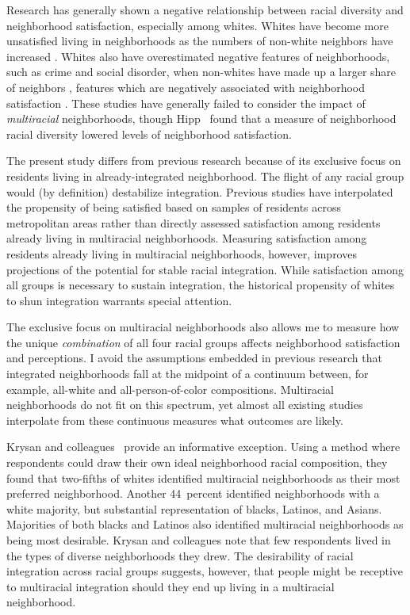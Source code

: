 \documentclass{baderart}
\begin{document}
Research has generally shown a negative relationship between racial diversity and neighborhood satisfaction, especially among whites. Whites have become more unsatisfied living in neighborhoods as the numbers of non-white neighbors have increased \citep{lee_neighborhood_1994, crowder_racial_2000, swaroop_determinants_2011, greif_intersection_2015}. Whites also have overestimated negative features of neighborhoods, such as crime and social disorder, when non-whites have made up a larger share of neighbors \citep{quillian_black_2001, sampson_seeing_2004}, features which are negatively associated with neighborhood satisfaction \citep{woldoff_effects_2002, hipp_specifying_2009}. These studies have generally failed to consider the impact of \emph{multiracial} neighborhoods, though Hipp~\citeyearpar{hipp_specifying_2009} found that a measure of neighborhood racial diversity lowered levels of neighborhood satisfaction.  

The present study differs from previous research because of its exclusive focus on residents living in already-integrated neighborhood. The flight of any racial group would (by definition) destabilize integration. Previous studies have interpolated the propensity of being satisfied based on samples of residents across metropolitan areas rather than directly assessed satisfaction among residents already living in multiracial neighborhoods. Measuring satisfaction among residents already living in multiracial neighborhoods, however, improves projections of the potential for stable racial integration. While satisfaction among all groups is necessary to sustain integration, the historical propensity of whites to shun integration warrants special attention. 

The exclusive focus on multiracial neighborhoods also allows me to measure how the unique \emph{combination} of all four racial groups affects neighborhood satisfaction and perceptions. I avoid the assumptions embedded in previous research that integrated neighborhoods fall at the midpoint of a continuum between, for example, all-white and all-person-of-color compositions. Multiracial neighborhoods do not fit on this spectrum, yet almost all existing studies interpolate from these continuous measures what outcomes are likely. 

Krysan and colleagues~\citeyearpar{krysan_diversity_2017} provide an informative exception. Using a method where respondents could draw their own ideal neighborhood racial composition, they found that two-fifths of whites identified multiracial neighborhoods as their most preferred neighborhood.  Another 44~percent identified neighborhoods with a white majority, but substantial representation of blacks, Latinos, and Asians. Majorities of both blacks and Latinos also identified multiracial neighborhoods as being most desirable. Krysan and colleagues note that few respondents lived in the types of diverse neighborhoods they drew. The desirability of racial integration across racial groups suggests, however, that people might be receptive to multiracial integration should they end up living in a multiracial neighborhood. 
\end{document}
